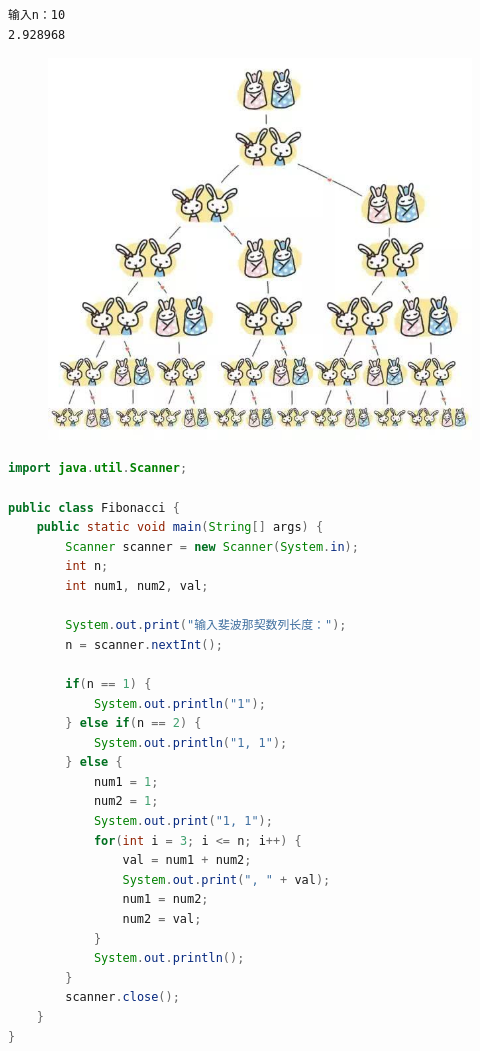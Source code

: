 \begin{tcolorbox}
\begin{verbatim}
输入n：10
2.928968
\end{verbatim}
\end{tcolorbox}

\vspace{0.5cm}


\begin{figure}[H]
	\centering
	\includegraphics[scale=0.45]{img/C4/4-4/1.png}
\end{figure}

\begin{lstlisting}[language=Java]
import java.util.Scanner;

public class Fibonacci {
    public static void main(String[] args) {
        Scanner scanner = new Scanner(System.in);
        int n;
        int num1, num2, val;
        
        System.out.print("输入斐波那契数列长度：");
        n = scanner.nextInt();
        
        if(n == 1) {
            System.out.println("1");
        } else if(n == 2) {
            System.out.println("1, 1");
        } else {
            num1 = 1;
            num2 = 1;
            System.out.print("1, 1");
            for(int i = 3; i <= n; i++) {
                val = num1 + num2;
                System.out.print(", " + val);
                num1 = num2;
                num2 = val;
            }
            System.out.println();
        }
        scanner.close();
    }
}
\end{lstlisting}

